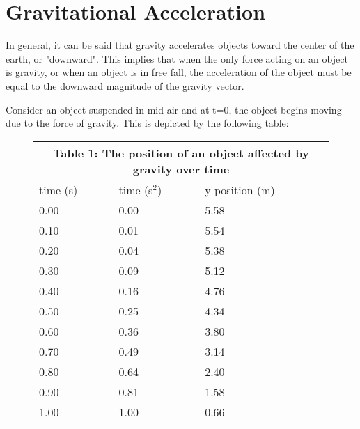 \documentclass[12pt]{article}
\begin{document}
\section{Gravitational Acceleration}
In general, it can be said that gravity accelerates objects toward the center of the earth, or "downward". This implies that when the only force acting on an object is gravity, or when an object is in free fall, the acceleration of the object must be equal to the downward magnitude of the gravity vector.

Consider an object suspended in mid-air and at t=0, the object begins moving due to the force of gravity. This is depicted by the following table:

\setlength{\tabcolsep}{10pt}
\renewcommand{\arraystretch}{1}

\begin{figure}[H]
    \centering
    \begin{tabular}{ |p{3cm}|p{3cm}|p{3cm}| }
        \hline
        \multicolumn{3}{|c|}{Table 1: The position of an object affected by gravity over time} \\
        \hline
        time (s) & time (s$^2$) & y-position (m)                           \\
        \hline
        0.00     & 0.00         & 5.58                                     \\
        0.10     & 0.01         & 5.54                                     \\
        0.20     & 0.04         & 5.38                                     \\
        0.30     & 0.09         & 5.12                                     \\
        0.40     & 0.16         & 4.76                                     \\
        0.50     & 0.25         & 4.34                                     \\
        0.60     & 0.36         & 3.80                                     \\
        0.70     & 0.49         & 3.14                                     \\
        0.80     & 0.64         & 2.40                                     \\
        0.90     & 0.81         & 1.58                                     \\
        1.00     & 1.00         & 0.66                                     \\
        \hline
    \end{tabular}
\end{figure}
\end{document}
